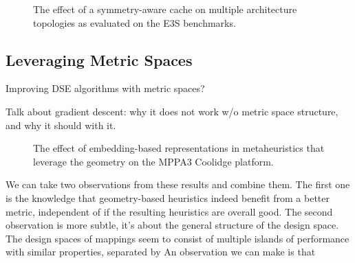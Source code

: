 \begin{figure}[h]
	\centering
   \resizebox{0.95\textwidth}{!}{}
	\caption{The effect of a symmetry-aware cache on multiple architecture topologies as evaluated on the \ac{E3S} benchmarks.}
	\label{fig:symmetry_coolidge_changed_operations}
\end{figure}

\subsection{Leveraging Metric Spaces}
Improving DSE algorithms with metric spaces?

Talk about gradient descent: why it does not work w/o metric space structure, and why it should with it.
\begin{figure}[h]
	\centering
   \resizebox{0.95\textwidth}{!}{}
	\caption{The effect of embedding-based representations in metaheuristics that leverage the geometry on the MPPA3 Coolidge platform.}
	\label{fig:coolidge_geometric}
\end{figure}

We can take two observations from these results and combine them.
The first one is the knowledge that geometry-based heuristics indeed benefit from a better metric, independent of if the resulting heuristics are overall good.
The second observation is more subtle, it's about the general structure of the design space. 
The design spaces of mappings seem to consist of multiple islands of performance with similar properties, separated by 
An observation we can make is that 

